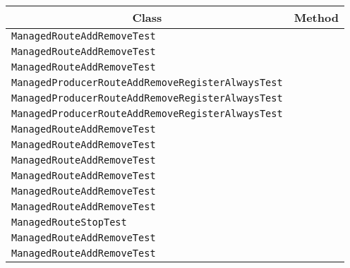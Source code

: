 \begin{center}
\begin{tabular}{ll}\toprule
\multicolumn{1}{c}{Class}&\multicolumn{1}{c}{Method}\\\midrule
\lstinline/ManagedRouteAddRemoveTest/&\raisebox{0pt}{\lstinline/testRouteAddRemoteRouteWithTo()/}\\
\lstinline/ManagedRouteAddRemoveTest/&\raisebox{0pt}{\lstinline/testRouteAddRemoteRouteWithTo()/}\\
\lstinline/ManagedRouteAddRemoveTest/&\raisebox{0pt}{\lstinline/testRouteAddRemoteRouteWithTo()/}\\
\lstinline/ManagedProducerRouteAddRemoveRegisterAlwaysTest/&\raisebox{0pt}{\lstinline/testRouteAddRemoteRouteWithRecipientList()/}\\
\lstinline/ManagedProducerRouteAddRemoveRegisterAlwaysTest/&\raisebox{0pt}{\lstinline/testRouteAddRemoteRouteWithRecipientList()/}\\
\lstinline/ManagedProducerRouteAddRemoveRegisterAlwaysTest/&\raisebox{0pt}{\lstinline/testRouteAddRemoteRouteWithRecipientList()/}\\
\lstinline/ManagedRouteAddRemoveTest/&\raisebox{0pt}{\lstinline/testRouteAddRemoteRouteWithRoutingSlip()/}\\
\lstinline/ManagedRouteAddRemoveTest/&\raisebox{0pt}{\lstinline/testRouteAddRemoteRouteWithRoutingSlip()/}\\
\lstinline/ManagedRouteAddRemoveTest/&\raisebox{0pt}{\lstinline/testRouteAddRemoteRouteWithRecipientList()/}\\
\lstinline/ManagedRouteAddRemoveTest/&\raisebox{0pt}{\lstinline/testRouteAddRemoteRouteWithRecipientList()/}\\
\lstinline/ManagedRouteAddRemoveTest/&\raisebox{0pt}{\lstinline/testRouteAddRemoteRouteWithRoutingSlip()/}\\
\lstinline/ManagedRouteAddRemoveTest/&\raisebox{0pt}{\lstinline/testRouteAddRemoteRouteWithRecipientList()/}\\
\lstinline/ManagedRouteStopTest/&\raisebox{0pt}{\lstinline/testStopRoute()/}\\
\lstinline/ManagedRouteAddRemoveTest/&\raisebox{0pt}{\lstinline/testRouteAddRemoteRouteWithRecipientListAndContextScopedOnCompletion()/}\\
\lstinline/ManagedRouteAddRemoveTest/&\raisebox{0pt}{\lstinline/testRouteAddRemoteRouteWithRecipientListAndContextScopedOnCompletion()/}\\

\end{tabular}
\end{center}
